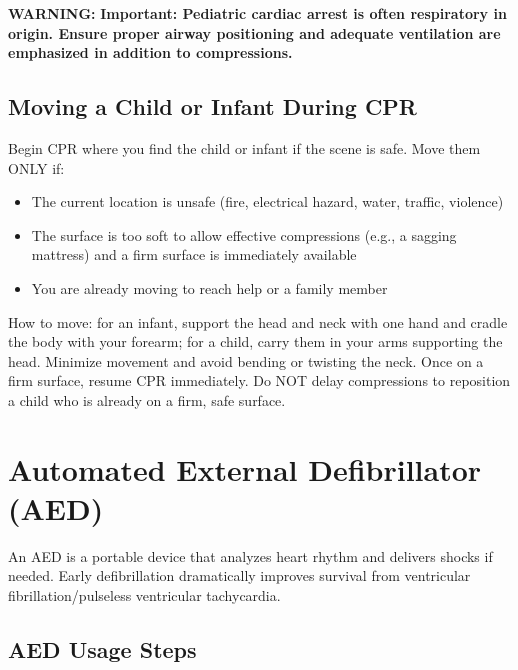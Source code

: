 \textbf{WARNING:} \textbf{Important: Pediatric cardiac arrest is often respiratory in origin. Ensure proper airway positioning and adequate ventilation are emphasized in addition to compressions.}

\subsection{Moving a Child or Infant During CPR}

Begin CPR where you find the child or infant if the scene is safe. Move them ONLY if:

\begin{itemize}[leftmargin=*]
  \item The current location is unsafe (fire, electrical hazard, water, traffic, violence)
  \item The surface is too soft to allow effective compressions (e.g., a sagging mattress) and a firm surface is immediately available
  \item You are already moving to reach help or a family member
\end{itemize}

How to move: for an infant, support the head and neck with one hand and cradle the body with your forearm; for a child, carry them in your arms supporting the head. Minimize movement and avoid bending or twisting the neck. Once on a firm surface, resume CPR immediately. Do NOT delay compressions to reposition a child who is already on a firm, safe surface.

\section{Automated External Defibrillator (AED)}

An AED is a portable device that analyzes heart rhythm and delivers shocks if needed. Early defibrillation dramatically improves survival from ventricular fibrillation/pulseless ventricular tachycardia.

\subsection{AED Usage Steps}

